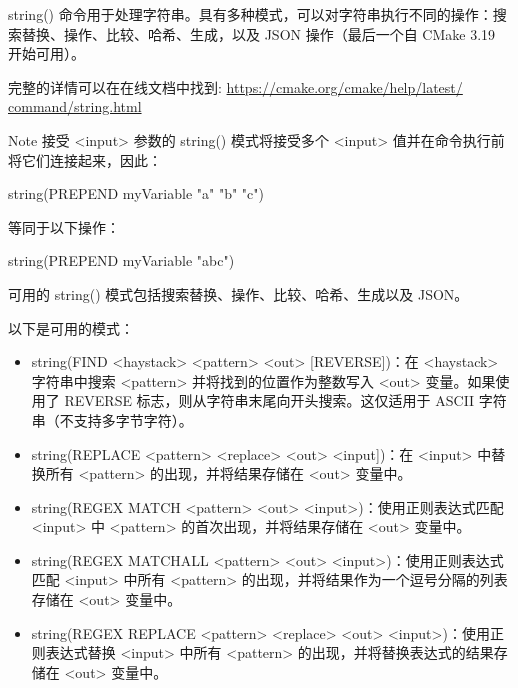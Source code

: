 

string() 命令用于处理字符串。具有多种模式，可以对字符串执行不同的操作：搜索替换、操作、比较、哈希、生成，以及 JSON 操作（最后一个自 CMake 3.19 开始可用）。

完整的详情可以在在线文档中找到: \url{https://cmake.org/cmake/help/latest/ command/string.html}

\begin{myNotic}{Note}
接受 <input> 参数的 string() 模式将接受多个 <input> 值并在命令执行前将它们连接起来，因此：

\begin{cmake}
string(PREPEND myVariable "a" "b" "c")
\end{cmake}

等同于以下操作：

\begin{cmake}
string(PREPEND myVariable "abc")
\end{cmake}
\end{myNotic}

可用的 string() 模式包括搜索替换、操作、比较、哈希、生成以及 JSON。


以下是可用的模式：

\begin{itemize}
\item
string(FIND <haystack> <pattern> <out> [REVERSE])：在 <haystack> 字符串中搜索 <pattern> 并将找到的位置作为整数写入 <out> 变量。如果使用了 REVERSE 标志，则从字符串末尾向开头搜索。这仅适用于 ASCII 字符串（不支持多字节字符）。

\item
string(REPLACE <pattern> <replace> <out> <input])：在 <input> 中替换所有 <pattern> 的出现，并将结果存储在 <out> 变量中。

\item
string(REGEX MATCH <pattern> <out> <input>)：使用正则表达式匹配 <input> 中 <pattern> 的首次出现，并将结果存储在 <out> 变量中。

\item
string(REGEX MATCHALL <pattern> <out> <input>)：使用正则表达式匹配 <input> 中所有 <pattern> 的出现，并将结果作为一个逗号分隔的列表存储在 <out> 变量中。

\item
string(REGEX REPLACE <pattern> <replace> <out> <input>)：使用正则表达式替换 <input> 中所有 <pattern> 的出现，并将替换表达式的结果存储在 <out> 变量中。
\end{itemize}

